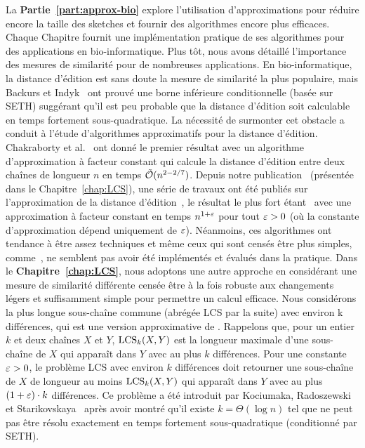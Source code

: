 La \textbf{Partie~\ref{part:approx-bio}} explore l'utilisation d'approximations pour réduire encore la taille des sketches et fournir des algorithmes encore plus efficaces. Chaque Chapitre fournit une implémentation pratique de ses algorithmes pour des applications en bio-informatique.
%
Plus tôt, nous avons détaillé l'importance des mesures de similarité pour de nombreuses applications.
%
En bio-informatique, la distance d'édition est sans doute la mesure de similarité la plus populaire, mais Backurs et Indyk~\cite{DBLP:conf/stoc/BackursI15} ont prouvé une borne inférieure conditionnelle (basée sur SETH) suggérant qu'il est peu probable que la distance d'édition soit calculable en temps fortement sous-quadratique.
%
La nécessité de surmonter cet obstacle a conduit à l'étude d'algorithmes approximatifs pour la distance d'édition. Chakraborty et al.~\cite{DBLP:conf/focs/ChakrabortyDGKS18} ont donné le premier résultat avec un algorithme d'approximation à facteur constant qui calcule la distance d'édition entre deux chaînes de longueur $n$ en temps $\tilde{\mathcal{O}}(n^{2-2/7})$.
Depuis notre publication~\cite{DBLP:conf/cpm/GourdelKRS20} (présentée dans le Chapitre~\ref{chap:LCS}), une série de travaux ont été publiés sur l'approximation de la distance d'édition~\cite{brakensiek2020constant,koucky2020constant}, le résultat le plus fort étant~\cite{andoni2020edit} avec une approximation à facteur constant en temps $n^{1+\varepsilon}$ pour tout $\varepsilon>0$ (où la constante d'approximation dépend uniquement de $\varepsilon$).
Néanmoins, ces algorithmes ont tendance à être assez techniques et même ceux qui sont censés être plus simples, comme~\cite{andoni2020simple}, ne semblent pas avoir été implémentés et évalués dans la pratique.
%
Dans le \textbf{Chapitre~\ref{chap:LCS}}, nous adoptons une autre approche en considérant une mesure de similarité différente censée être à la fois robuste aux changements légers et suffisamment simple pour permettre un calcul efficace. Nous considérons la plus longue sous-chaîne commune (abrégée LCS par la suite) avec environ k différences, qui est une version approximative de \kLCS. Rappelons que, pour un entier $k$ et deux chaînes $X$ et $Y$, $\mathrm{LCS}_{k}(X,Y)$ est la longueur maximale d'une sous-chaîne de $X$ qui apparaît dans $Y$ avec au plus $k$ différences.
Pour une constante $\varepsilon > 0$, le problème LCS avec environ $k$ différences doit retourner une sous-chaîne de $X$ de longueur au moins $\mathrm{LCS}_{k}(X,Y)$ qui apparaît dans $Y$ avec au plus $(1+\varepsilon) \cdot k$ différences. Ce problème a été introduit par Kociumaka, Radoszewski et Starikovskaya~\cite{DBLP:journals/algorithmica/KociumakaRS19} après avoir montré qu'il existe $k=\Theta(\log n)$ tel que \kLCS ne peut pas être résolu exactement en temps fortement sous-quadratique (conditionné par SETH).
